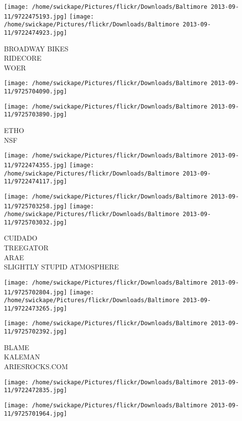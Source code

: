 \documentclass[10pt,letterpaper]{article}
\begin{document}
\vspace{0.25in}
\texttt{[image: /home/swickape/Pictures/flickr/Downloads/Baltimore 2013-09-11/9722475193.jpg]}
\texttt{[image: /home/swickape/Pictures/flickr/Downloads/Baltimore 2013-09-11/9722474923.jpg]}

BROADWAY BIKES\\
RIDECORE\\
WOER
\pagebreak

\texttt{[image: /home/swickape/Pictures/flickr/Downloads/Baltimore 2013-09-11/9725704090.jpg]}

\vspace{0.25in}
\texttt{[image: /home/swickape/Pictures/flickr/Downloads/Baltimore 2013-09-11/9725703890.jpg]}

ETHO\\
NSF
\pagebreak

\texttt{[image: /home/swickape/Pictures/flickr/Downloads/Baltimore 2013-09-11/9722474355.jpg]}
\texttt{[image: /home/swickape/Pictures/flickr/Downloads/Baltimore 2013-09-11/9722474117.jpg]}

\texttt{[image: /home/swickape/Pictures/flickr/Downloads/Baltimore 2013-09-11/9725703258.jpg]}
\texttt{[image: /home/swickape/Pictures/flickr/Downloads/Baltimore 2013-09-11/9725703032.jpg]}

CUIDADO\\
TREEGATOR\\
ARAE\\
SLIGHTLY STUPID ATMOSPHERE
\pagebreak

\texttt{[image: /home/swickape/Pictures/flickr/Downloads/Baltimore 2013-09-11/9725702804.jpg]}
\texttt{[image: /home/swickape/Pictures/flickr/Downloads/Baltimore 2013-09-11/9722473265.jpg]}

\vspace{0.25in}
\texttt{[image: /home/swickape/Pictures/flickr/Downloads/Baltimore 2013-09-11/9725702392.jpg]}

BLAME\\
KALEMAN\\
ARIESROCKS.COM
\pagebreak

\texttt{[image: /home/swickape/Pictures/flickr/Downloads/Baltimore 2013-09-11/9722472835.jpg]}

\vspace{0.25in}
\texttt{[image: /home/swickape/Pictures/flickr/Downloads/Baltimore 2013-09-11/9725701964.jpg]}
\end{document}
